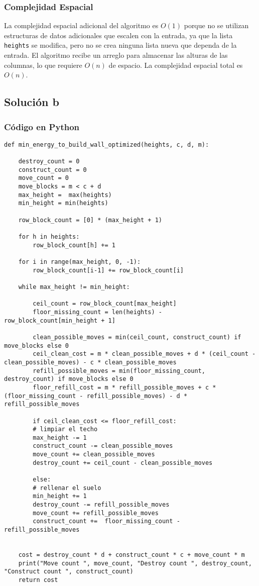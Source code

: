 \documentclass[a4paper,12pt]{article}
\begin{document}
\subsubsection{Complejidad Espacial}

La complejidad espacial adicional del algoritmo es \( O(1) \) porque no se utilizan estructuras de datos adicionales que escalen con la entrada, ya que la lista \texttt{heights} se modifica, pero no se crea ninguna lista nueva que dependa de la entrada. El algoritmo recibe un arreglo para almacenar las alturas de las columnas, lo que requiere \( O(n) \) de espacio. La complejidad espacial total es \( O(n) \).

\subsection{Solución b}

\subsubsection{Código en Python}
\begin{lstlisting}
def min_energy_to_build_wall_optimized(heights, c, d, m):

	destroy_count = 0
	construct_count = 0
	move_count = 0
	move_blocks = m < c + d
	max_height =  max(heights)
	min_height = min(heights)

	row_block_count = [0] * (max_height + 1)

	for h in heights:
		row_block_count[h] += 1

	for i in range(max_height, 0, -1):
		row_block_count[i-1] += row_block_count[i]

	while max_height != min_height:   

		ceil_count = row_block_count[max_height]
		floor_missing_count = len(heights) - row_block_count[min_height + 1] 

		clean_possible_moves = min(ceil_count, construct_count) if move_blocks else 0
		ceil_clean_cost = m * clean_possible_moves + d * (ceil_count - clean_possible_moves) - c * clean_possible_moves
		refill_possible_moves = min(floor_missing_count, destroy_count) if move_blocks else 0
		floor_refill_cost = m * refill_possible_moves + c * (floor_missing_count - refill_possible_moves) - d * refill_possible_moves

		if ceil_clean_cost <= floor_refill_cost:
		# limpiar el techo
		max_height -= 1
		construct_count -= clean_possible_moves
		move_count += clean_possible_moves
		destroy_count += ceil_count - clean_possible_moves

		else: 
		# rellenar el suelo
		min_height += 1
		destroy_count -= refill_possible_moves
		move_count += refill_possible_moves
		construct_count +=  floor_missing_count - refill_possible_moves


	cost = destroy_count * d + construct_count * c + move_count * m
	print("Move count ", move_count, "Destroy count ", destroy_count, "Construct count ", construct_count)
	return cost
\end{lstlisting}
\end{document}
